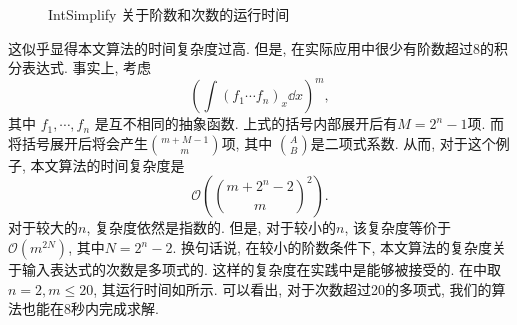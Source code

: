 \begin{figure}[htb]
\centering
{}
\caption{IntSimplify 关于阶数和次数的运行时间}
\end{figure}

这似乎显得本文算法的时间复杂度过高. 但是, 在实际应用中很少有阶数超过8的积分表达式. 事实上, 考虑
\begin{equation}
\left(\int\!{(f_1\cdots f_n)_x\dd x}\right)^m,
\label{poly}
\end{equation}
其中 $f_1,\cdots,f_n$ 是互不相同的抽象函数. 上式的括号内部展开后有$M=2^n-1$项. 而将括号展开后将会产生$\binom{m+M-1}{m}$项, 其中 $\binom{A}{B}$是二项式系数. 从而, 对于这个例子, 本文算法的时间复杂度是 
\begin{equation}
\mathcal O\left(\binom{m+2^n-2}{m}^2\right).
\label{polynomial_complexity}    
\end{equation}
对于较大的$n$, 复杂度依然是指数的. 但是, 对于较小的$n$, 该复杂度等价于
$\mathcal O(m^{2N})$, 其中$N=2^n-2$. 换句话说, 在较小的阶数条件下, 本文算法的复杂度关于输入表达式的次数是多项式的. 这样的复杂度在实践中是能够被接受的. 在中取$n=2,m\le 20$, 其运行时间如所示. 可以看出, 对于次数超过20的多项式, 我们的算法也能在8秒内完成求解. 

